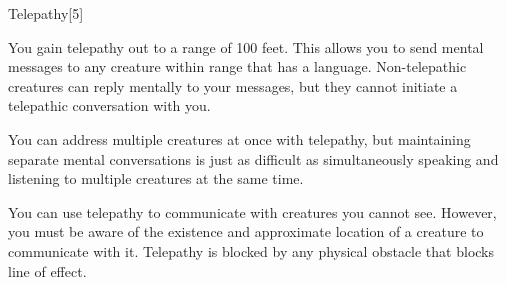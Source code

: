 \begin{spellsection}{Telepathy}[5]
    \begin{spellheader}
    \end{spellheader}
    \begin{spellcontent}
        \begin{spelltargetinginfo}
        \end{spelltargetinginfo}
        \begin{spelleffects}
            \spelleffect You gain telepathy out to a range of 100 feet. This allows you to send mental messages to any creature within range that has a language. Non-telepathic creatures can reply mentally to your messages, but they cannot initiate a telepathic conversation with you.

            You can address multiple creatures at once with telepathy, but maintaining separate mental conversations is just as difficult as simultaneously speaking and listening to multiple creatures at the same time.
            \spelldur \durlong
        \end{spelleffects}
    \end{spellcontent}
    \begin{spellfooter}
        \spellnotes You can use telepathy to communicate with creatures you cannot see. However, you must be aware of the existence and approximate location of a creature to communicate with it. Telepathy is blocked by any physical obstacle that blocks line of effect.
        \miscastexplode
    \end{spellfooter}
    \begin{spellaugments}
    \end{spellaugments}
\end{spellsection}


